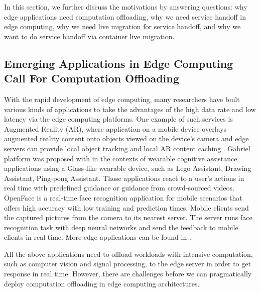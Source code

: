 In this section, we further discuss the motivations by answering
questions: why edge applications need computation offloading, why we need  
service handoff in edge computing, why we need live migration for service handoff, and why we want to do service handoff via container live migration.

\subsection{Emerging Applications in Edge Computing Call For Computation Offloading}

With the rapid development of edge computing, many researchers have built various kinds of applications to take the advantages of the high data rate and low latency via the edge computing platforms. 
One example of such services is Augmented Reality (AR), where application on a mobile device overlays augmented reality content
onto objects viewed on the device's camera and edge servers can
provide local object tracking and local AR content caching
\cite{satya2009case,MEC2014initiative,MEC2015-5G,hao2017challenges}.
%
Gabriel platform \cite{ha2014wearable}  was proposed with in the contexts of wearable cognitive assistance applications using a Glass-like wearable device, such as Lego Assistant, Drawing Assistant, Ping-pong Assistant.%
Those applications react to a user's actions in real time with predefined guidance or guidance from crowd-sourced videos. 
%
%
OpenFace\cite{openface2016} is a real-time face recognition application for mobile scenarios that offers high accuracy with low training and prediction times. Mobile clients send the captured pictures from the camera to its nearest server. The server runs face recognition task with deep neural networks and send the feedback to mobile clients in real time.  
More edge applications can be found in \cite{yi2015fog,yi2015survey,satya2017edge}.

All the above applications need to offload workloads with intensive computation, such as computer vision and signal processing, to the edge server in order to get response in real time. However, there are challenges before we can pragmatically deploy computation offloading in edge computing architectures. 

